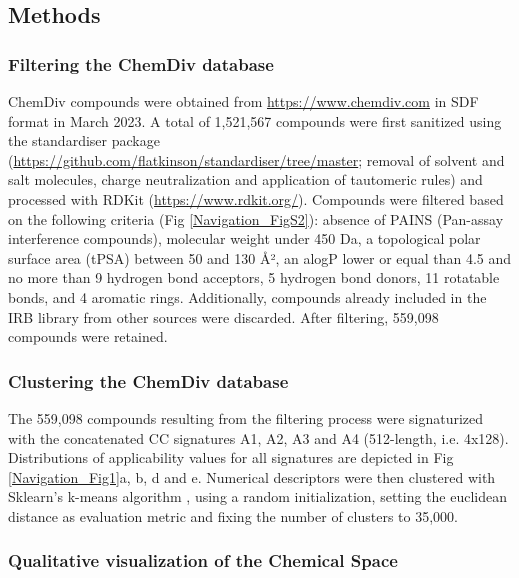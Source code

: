 \subsection{Methods}
\label{Navigation_Methods}



\subsubsection{Filtering the ChemDiv database}

ChemDiv compounds were obtained from \href{https://www.chemdiv.com}{https://www.chemdiv.com} in SDF format in March 2023. A total of 1,521,567 compounds were first sanitized using the standardiser package (\href{https://github.com/flatkinson/standardiser/tree/master}{https://github.com/flatkinson/standardiser/tree/master}; removal of solvent and salt molecules, charge neutralization and application of tautomeric rules) and processed with RDKit (\href{https://www.rdkit.org/}{https://www.rdkit.org/}). Compounds were filtered based on the following criteria (Fig \ref{Navigation_FigS2}): absence of PAINS\cite{baell_chemistry_2014} (Pan-assay interference compounds), molecular weight under 450 Da, a topological polar surface area (tPSA) between 50 and 130 Å², an alogP lower or equal than 4.5 and no more than 9 hydrogen bond acceptors, 5 hydrogen bond donors, 11 rotatable bonds, and 4 aromatic rings. Additionally, compounds already included in the IRB library from other sources were discarded. After filtering, 559,098 compounds were retained.


\subsubsection{Clustering the ChemDiv database}

The 559,098 compounds resulting from the filtering process were signaturized with the concatenated CC signatures A1, A2, A3 and A4 (512-length, i.e. 4x128). Distributions of applicability values for all signatures are depicted in Fig \ref{Navigation_Fig1}a, b, d and e. Numerical descriptors were then clustered with Sklearn’s k-means algorithm \cite{pedregosa_scikit-learn_2011}, using a random initialization, setting the euclidean distance as evaluation metric and fixing the number of clusters to 35,000. 

\subsubsection{Qualitative visualization of the Chemical Space}

